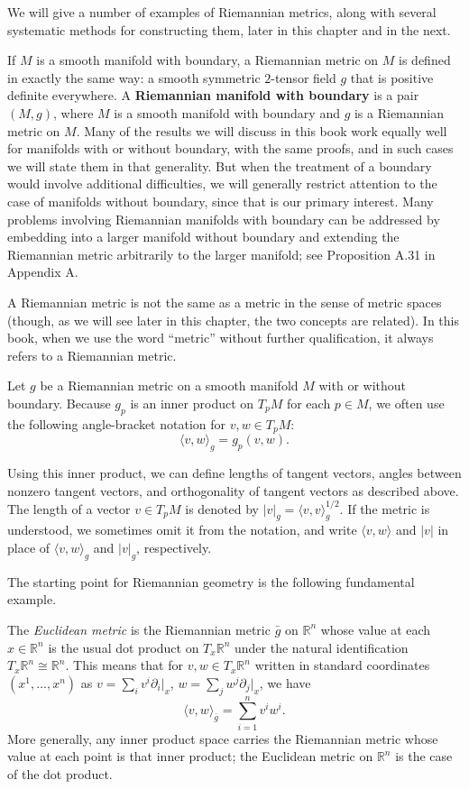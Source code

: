 We will give a number of examples of Riemannian metrics, along with several systematic methods for constructing them, later in this chapter and in the next.

If $M$ is a smooth manifold with boundary, a Riemannian metric on $M$ is defined in exactly the same way: a smooth symmetric $2$-tensor field $g$ that is positive definite everywhere. A \textbf{Riemannian manifold with boundary} is a pair $(M, g)$, where $M$ is a smooth manifold with boundary and $g$ is a Riemannian metric on $M$. Many of the results we will discuss in this book work equally well for manifolds with or without boundary, with the same proofs, and in such cases we will state them in that generality. But when the treatment of a boundary would involve additional difficulties, we will generally restrict attention to the case of manifolds without boundary, since that is our primary interest. Many problems involving Riemannian manifolds with boundary can be addressed by embedding into a larger manifold without boundary and extending the Riemannian metric arbitrarily to the larger manifold; see Proposition A.31 in Appendix A.

A Riemannian metric is not the same as a metric in the sense of metric spaces (though, as we will see later in this chapter, the two concepts are related). In this book, when we use the word ``metric'' without further qualification, it always refers to a Riemannian metric.

Let $g$ be a Riemannian metric on a smooth manifold $M$ with or without boundary. Because $g_p$ is an inner product on $T_p M$ for each $p \in M$, we often use the following angle-bracket notation for $v, w \in T_p M$:
\[
\langle v, w \rangle_g = g_p(v, w).
\]

Using this inner product, we can define lengths of tangent vectors, angles between nonzero tangent vectors, and orthogonality of tangent vectors as described above. The length of a vector $v \in T_p M$ is denoted by $|v|_g = \langle v, v \rangle_g^{1/2}$. If the metric is understood, we sometimes omit it from the notation, and write $\langle v, w \rangle$ and $|v|$ in place of $\langle v, w \rangle_g$ and $|v|_g$, respectively.

The starting point for Riemannian geometry is the following fundamental example.

\begin{definition}
\label{ex:euclidean-metric}
\leanok
{}
The \emph{Euclidean metric} is the Riemannian metric $\bar{g}$ on $\mathbb{R}^n$ whose value at each $x \in \mathbb{R}^n$ is the usual dot product on $T_x\mathbb{R}^n$ under the natural identification $T_x \mathbb{R}^n \cong \mathbb{R}^n$. This means that for $v,w \in T_x \mathbb{R}^n$ written in standard coordinates $(x^1, \ldots, x^n)$ as $v = \sum_i v^i \partial_i|_x$, $w = \sum_j w^j \partial_j|_x$, we have
\[
\langle v, w \rangle_{\bar{g}} = \sum_{i=1}^n v^i w^i.
\]
More generally, any inner product space carries the Riemannian metric whose value at each point is that inner product; the Euclidean metric on $\mathbb{R}^n$ is the case of the dot product.
\end{definition}

